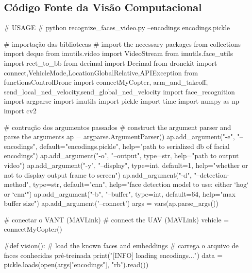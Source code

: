 
\begin{apendicesenv}

\partapendices

\chapter{Código Fonte da Visão Computacional}

\begin{python_}
# USAGE
# python recognize_faces_video.py --encodings encodings.pickle

# importação das bibliotecas
# import the necessary packages
from collections import deque
from imutils.video import VideoStream
from imutils.face_utils import rect_to_bb
from decimal import Decimal
from dronekit import connect,VehicleMode,LocationGlobalRelative,APIException
from functionsControlDrone import connectMyCopter, 
arm_and_takeoff, send_local_ned_velocity,send_global_ned_velocity
import face_recognition
import argparse
import imutils
import pickle
import time
import numpy as np
import cv2


# contrução dos argumentos passados
# construct the argument parser and parse the arguments
ap = argparse.ArgumentParser()
ap.add_argument("-e", "--encodings", default="encodings.pickle",
help="path to serialized db of facial encodings")
ap.add_argument("-o", "--output", type=str,	
help="path to output video")
ap.add_argument("-y", "--display", type=int, default=1,	
help="whether or not to display output frame to screen")
ap.add_argument("-d", "--detection-method", type=str, default="cnn", 
help="face detection model to use: either `hog` or `cnn`")
ap.add_argument("-b", "--buffer", type=int, default=64,	
help="max buffer size")
ap.add_argument('--connect')	
args = vars(ap.parse_args())

# conectar o VANT (MAVLink)
# connect the UAV (MAVLink)
vehicle = connectMyCopter()

#def vision():
# load the known faces and embeddings
# carrega o arquivo de faces conhecidas pré-treinada
print("[INFO] loading encodings...")
data = pickle.loads(open(args["encodings"], "rb").read())


\end{python_}
\end{apendicesenv}
